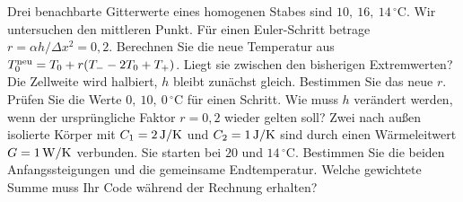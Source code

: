
Drei benachbarte Gitterwerte eines homogenen Stabes sind \(10,\ 16,\ 14\,^\circ\mathrm C\). Wir untersuchen den mittleren Punkt. Für einen Euler-Schritt betrage \(r=\alpha h/\Delta x^2=0{,}2\). Berechnen Sie die neue Temperatur aus \(T_0^{\rm neu}=T_0+r(T_- -2T_0+T_+)\). Liegt sie zwischen den bisherigen Extremwerten?
Die Zellweite wird halbiert, \(h\) bleibt zunächst gleich. Bestimmen Sie das neue \(r\). Prüfen Sie die Werte \(0,\ 10,\ 0\,^\circ\mathrm C\) für einen Schritt. Wie muss \(h\) verändert werden, wenn der ursprüngliche Faktor \(r=0{,}2\) wieder gelten soll?
Zwei nach außen isolierte Körper mit \(C_1=2\,\mathrm{J/K}\) und \(C_2=1\,\mathrm{J/K}\) sind durch einen Wärmeleitwert \(G=1\,\mathrm{W/K}\) verbunden. Sie starten bei \(20\) und \(14\,^\circ\mathrm C\). Bestimmen Sie die beiden Anfangssteigungen und die gemeinsame Endtemperatur. Welche gewichtete Summe muss Ihr Code während der Rechnung erhalten?

\schreibfeld



